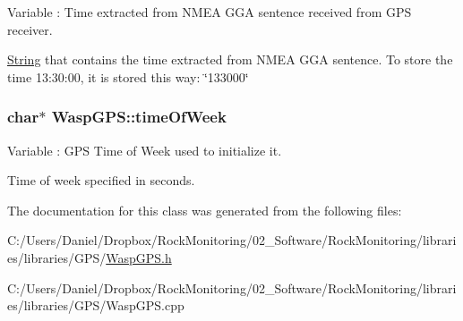 Variable \+: Time extracted from N\+M\+EA G\+GA sentence received from G\+PS receiver. 

\hyperlink{class_string}{String} that contains the time extracted from N\+M\+EA G\+GA sentence. To store the time 13\+:30\+:00, it is stored this way\+: \char`\"{}133000\char`\"{} 
\subsubsection[{\texorpdfstring{time\+Of\+Week}{timeOfWeek}}]{\setlength{\rightskip}{0pt plus 5cm}char$\ast$ Wasp\+G\+P\+S\+::time\+Of\+Week}\hypertarget{class_wasp_g_p_s_a55ac56acd96b1395b64abe8aa561ddcd}{}\label{class_wasp_g_p_s_a55ac56acd96b1395b64abe8aa561ddcd}


Variable \+: G\+PS Time of Week used to initialize it. 

Time of week specified in seconds. 

The documentation for this class was generated from the following files\+:\begin{DoxyCompactItemize}
\item 
C\+:/\+Users/\+Daniel/\+Dropbox/\+Rock\+Monitoring/02\+\_\+\+Software/\+Rock\+Monitoring/libraries/libraries/\+G\+P\+S/\hyperlink{_wasp_g_p_s_8h}{Wasp\+G\+P\+S.\+h}\item 
C\+:/\+Users/\+Daniel/\+Dropbox/\+Rock\+Monitoring/02\+\_\+\+Software/\+Rock\+Monitoring/libraries/libraries/\+G\+P\+S/Wasp\+G\+P\+S.\+cpp\end{DoxyCompactItemize}
